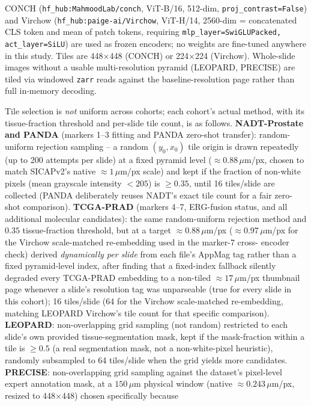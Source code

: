 CONCH (\texttt{hf\_hub:MahmoodLab/conch}, ViT-B/16, 512-dim, \texttt{proj\_contrast=False})
and Virchow (\texttt{hf\_hub:paige-ai/Virchow}, ViT-H/14, 2560-dim = concatenated CLS token
and mean of patch tokens, requiring \texttt{mlp\_layer=SwiGLUPacked, act\_layer=SiLU}) are used
as frozen encoders; no weights are fine-tuned anywhere in this study. Tiles are 448$\times$448
(CONCH) or 224$\times$224 (Virchow). Whole-slide images without a usable multi-resolution
pyramid (LEOPARD, PRECISE) are tiled via windowed \texttt{zarr} reads against the
baseline-resolution page rather than full in-memory decoding.

Tile selection is \emph{not} uniform across cohorts; each cohort's actual method, with its
tissue-fraction threshold and per-slide tile count, is as follows. \textbf{NADT-Prostate and
PANDA} (markers 1--3 fitting and PANDA zero-shot transfer): random-uniform rejection sampling
-- a random $(y_0,x_0)$ tile origin is drawn repeatedly (up to 200 attempts per slide) at a
fixed pyramid level ($\approx 0.88\,\mu$m/px, chosen to match SICAPv2's native
$\approx 1\,\mu$m/px scale) and kept if the fraction of non-white pixels (mean grayscale
intensity $<205$) is $\geq 0.35$, until 16 tiles/slide are collected (PANDA deliberately reuses
NADT's exact tile count for a fair zero-shot comparison). \textbf{TCGA-PRAD} (markers 4--7,
ERG-fusion status, and all additional molecular candidates): the same random-uniform
rejection method and $0.35$ tissue-fraction threshold, but at a target $\approx 0.88\,\mu$m/px
($\approx 0.97\,\mu$m/px for the Virchow scale-matched re-embedding used in the marker-7 cross-
encoder check) derived \emph{dynamically per slide} from each file's AppMag tag rather than a
fixed pyramid-level index, after finding that a fixed-index fallback silently degraded every
TCGA-PRAD embedding to a non-tiled $\approx 17\,\mu$m/px thumbnail page whenever a slide's
resolution tag was unparseable (true for every slide in this cohort); 16 tiles/slide (64 for
the Virchow scale-matched re-embedding, matching LEOPARD Virchow's tile count for that specific
comparison). \textbf{LEOPARD}: non-overlapping grid sampling (not random) restricted to each
slide's own provided tissue-segmentation mask, kept if the mask-fraction within a tile is
$\geq 0.5$ (a real segmentation mask, not a non-white-pixel heuristic), randomly subsampled to
64 tiles/slide when the grid yields more candidates. \textbf{PRECISE}: non-overlapping grid
sampling against the dataset's pixel-level expert annotation mask, at a $150\,\mu$m physical
window (native $\approx 0.243\,\mu$m/px, resized to 448$\times$448) chosen specifically because
